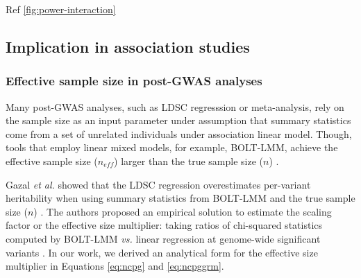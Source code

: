 \documentclass[]{book}
\begin{document}
Ref \ref{fig:power-interaction}

\subsection{Implication in association
studies}\label{implication-in-association-studies}

\subsubsection{Effective sample size in post-GWAS
analyses}\label{effective-sample-size-in-post-gwas-analyses}

Many post-GWAS analyses, such as LDSC regresssion or meta-analysis, rely
on the sample size as an input parameter under assumption that summary
statistics come from a set of unrelated individuals under association
linear model. Though, tools that employ linear mixed models, for
example, BOLT-LMM, achieve the effective sample size (\(n_{eff}\))
larger than the true sample size (\(n\)) \citep{loh2018mixed}.

Gazal \emph{et al.} showed that the LDSC regression overestimates
per-variant heritability when using summary statistics from BOLT-LMM and
the true sample size (\(n\)) \citep{Gazal2017}. The authors proposed an
empirical solution to estimate the scaling factor or the effective size
multiplier: taking ratios of chi-squared statistics computed by BOLT-LMM
\emph{vs.} linear regression at genome-wide significant variants
\citep{loh2018mixed}. In our work, we derived an analytical form for the
effective size multiplier in Equations \eqref{eq:ncpg} and
\eqref{eq:ncpggrm}.
\end{document}
